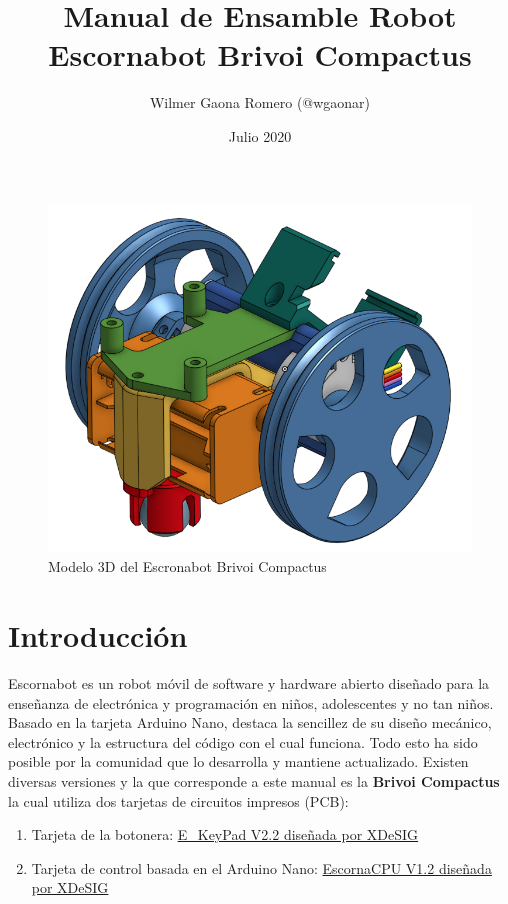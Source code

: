 \documentclass{article}
\title{Manual de Ensamble Robot Escornabot Brivoi Compactus}
\author{Wilmer Gaona Romero (@wgaonar)}
\date{Julio 2020}
\begin{document}
\maketitle

\begin{figure}[H]
    \centering
    \includegraphics[width=0.5\columnwidth]{images/portadaOnshape.png}
    \caption{Modelo 3D del Escronabot Brivoi Compactus}
    \label{fig:modelo3D}
\end{figure}

\section{Introducción}
Escornabot es un robot móvil de software y hardware abierto diseñado para la enseñanza de electrónica y programación en niños, adolescentes y no tan niños. Basado en la tarjeta Arduino Nano, destaca la sencillez de su diseño mecánico, electrónico y la estructura del código con el cual funciona. Todo esto ha sido posible por la comunidad que lo desarrolla y mantiene actualizado. Existen diversas versiones y la que corresponde a este manual es la \textbf{Brivoi Compactus} la cual utiliza dos tarjetas de circuitos impresos (PCB):

\begin{enumerate}
    \item Tarjeta de la botonera: \href{https://github.com/xdesig/escornabot-electronics/tree/master/Electronics/E_KEYPAD/E_KEYPAD_2.20}{E\_KeyPad V2.2 diseñada por XDeSIG}
    \item Tarjeta de control basada en el Arduino Nano:
    \href{https://github.com/xdesig/escornabot-electronics/tree/master/Electronics/EscornaCPU/1.x/1.20}{EscornaCPU V1.2 diseñada por XDeSIG}
\end{enumerate}
\end{document}
